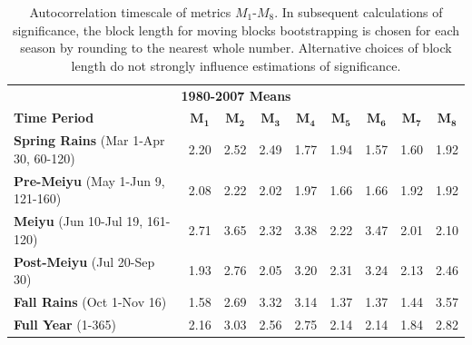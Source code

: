 \documentclass{ametsoc}
\begin{document}
\begin{table}[p]

\centering

\caption{Autocorrelation timescale of metrics $M_1$-$M_8$. In subsequent calculations of significance, the block length for moving blocks bootstrapping is chosen for each season by rounding to the nearest whole number. Alternative choices of block length do not strongly influence estimations of significance.}

\begin{tabular}{ l c c c c c c c c}
	 \multicolumn{9}{c}{\textbf{1980-2007 Means}} \\
	 \textbf{Time Period} 						& $\boldsymbol{M_1}$ & $\boldsymbol{M_2}$ & $\boldsymbol{M_3}$ & $\boldsymbol{M_4}$ & $\boldsymbol{M_5}$ & $\boldsymbol{M_6}$ & $\boldsymbol{M_7}$ & $\boldsymbol{M_8}$ \\	
	 \hline
	\textbf{Spring Rains} (Mar 1-Apr 30, 60-120) 	& 2.20 & 2.52 & 2.49 & 1.77 & 1.94 & 1.57 & 1.60 & 1.92 \\
	\textbf{Pre-Meiyu} (May 1-Jun 9, 121-160) 		& 2.08 & 2.22 & 2.02 & 1.97 & 1.66 & 1.66 & 1.92 & 1.92 \\		
	\textbf{Meiyu} (Jun 10-Jul 19, 161-120) 		& 2.71 & 3.65 & 2.32 & 3.38 & 2.22 & 3.47 & 2.01 & 2.10 \\
	\textbf{Post-Meiyu} (Jul 20-Sep 30) 			& 1.93 & 2.76 & 2.05 & 3.20 & 2.31 & 3.24 & 2.13 & 2.46 \\
	\textbf{Fall Rains} (Oct 1-Nov 16) 				& 1.58 & 2.69 & 3.32 & 3.14 & 1.37 & 1.37 & 1.44 & 3.57 \\
	\textbf{Full Year} (1-365)	 				& 2.16 & 3.03 & 2.56 & 2.75 & 2.14 & 2.14 & 1.84 & 2.82 \\
\end{tabular}
\label{tab:t311}
\end{table}
\end{document}
